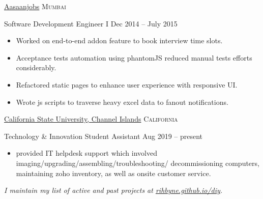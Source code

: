 \documentclass[11pt,a4paper]{article}
\begin{document}
\headedsection
    {\href{https://www.aasaanjobs.com/}{Aasaanjobs}}
    {\textsc{Mumbai}}
    {%
      \headedsubsection
      {Software Development Engineer I}
      {Dec 2014 -- July 2015}
      {
        \begin{itemize}
          \item Worked on end-to-end addon feature to book interview time slots.
          \item Acceptance tests automation using phantomJS reduced manual tests efforts considerably.
          \item Refactored static pages to enhance user experience with responsive UI.
          \item Wrote js scripts to traverse heavy excel data to fanout notifications.
        \end{itemize}
      }
    }

\headedsection
    {\href{https://www.csuci.edu/}{California State University, Channel Islands}}
    {\textsc{California}}
    {%
      \headedsubsection
      {Technology \& Innovation Student Assistant}
      {Aug 2019 -- present}
      {
        \begin{itemize}
        \item provided IT helpdesk support which involved imaging/upgrading/assembling/troubleshooting/
          decommissioning computers, maintaining zoho inventory, as well as onsite customer service.
        \end{itemize}
      }
    }

\vspace{-0.2em}
\begin{center}
  \emph{\textmd I maintain my list of active and past projects at \href{http://rihbyne.github.io/diy}{rihbyne.github.io/diy}.}
\end{center}


\spacedhrule{-0.2em}{-0.4em}

\end{document}
